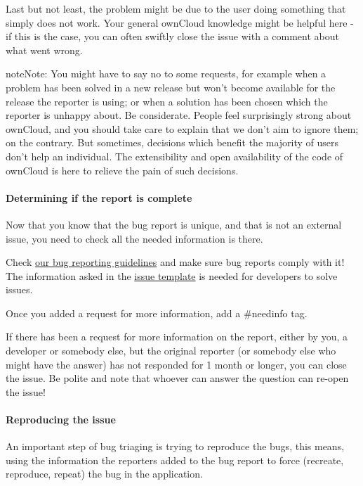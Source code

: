 \documentclass[letterpaper,10pt,english]{sphinxmanual}
\begin{document}
Last but not least, the problem might be due to the user doing something that simply does not work. Your general ownCloud knowledge might be helpful here - if this is the case, you can often swiftly close the issue with a comment about what went wrong.

\begin{notice}{note}{Note:}
You might have to say no to some requests, for example when a problem has been solved in a new release but won't become available for the release the reporter is using; or when a solution has been chosen which the reporter is unhappy about. Be considerate. People feel surprisingly strong about ownCloud, and you should take care to explain that we don't aim to ignore them; on the contrary. But sometimes, decisions which benefit the majority of users don't help an individual. The extensibility and open availability of the code of ownCloud is here to relieve the pain of such decisions.
\end{notice}


\paragraph{Determining if the report is complete}
\label{bugtracker/triaging:determining-if-the-report-is-complete}
Now that you know that the bug report is unique, and that is not an external issue, you need to check all the needed information is there.

Check \href{https://github.com/owncloud/core/blob/master/.github/CONTRIBUTING.md\#submitting-issues}{our bug reporting guidelines} and make sure bug reports comply with it! The information asked in the \href{https://raw.github.com/owncloud/core/master/.github/issue\_template.md}{issue template} is needed for developers to solve issues.

Once you added a request for more information, add a \#needinfo tag.

If there has been a request for more information on the report, either by you, a developer or somebody else, but the original reporter (or somebody else who might have the answer) has not responded for 1 month or longer, you can close the issue. Be polite and note that whoever can answer the question can re-open the issue!


\paragraph{Reproducing the issue}
\label{bugtracker/triaging:reproducing-the-issue}
An important step of bug triaging is trying to reproduce the bugs, this means, using the information the reporters added to the bug report to force (recreate, reproduce, repeat) the bug in the application.
\end{document}
